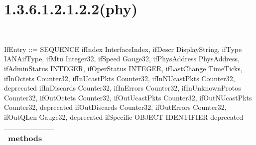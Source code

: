 \documentclass[letterpaper,10pt,english]{sphinxmanual}
\begin{document}
\section{1.3.6.1.2.1.2.2(phy)}
\label{\detokenize{oids:phy}}

\begin{fulllineitems}
\label{\detokenize{oids:confd_global_interface_container.confd_global_interface_container}}~
\def\sphinxLiteralBlockLabel{\label{\detokenize{oids:if-mib}}}
\begin{sphinxVerbatim}[commandchars=\\\{\}]
 IfEntry ::=
     SEQUENCE \PYGZob{}
         ifIndex                 InterfaceIndex,
         ifDescr                 DisplayString,
         ifType                  IANAifType,
         ifMtu                   Integer32,
         ifSpeed                 Gauge32,
         ifPhysAddress           PhysAddress,
         ifAdminStatus           INTEGER,
         ifOperStatus            INTEGER,
         ifLastChange            TimeTicks,
         ifInOctets              Counter32,
         ifInUcastPkts           Counter32,
         ifInNUcastPkts          Counter32,  \PYGZhy{}\PYGZhy{} deprecated
         ifInDiscards            Counter32,
         ifInErrors              Counter32,
         ifInUnknownProtos       Counter32,
         ifOutOctets             Counter32,
         ifOutUcastPkts          Counter32,
         ifOutNUcastPkts         Counter32,  \PYGZhy{}\PYGZhy{} deprecated
         ifOutDiscards           Counter32,
         ifOutErrors             Counter32,
         ifOutQLen               Gauge32,    \PYGZhy{}\PYGZhy{} deprecated
         ifSpecific              OBJECT IDENTIFIER \PYGZhy{}\PYGZhy{} deprecated
     \PYGZcb{}
\end{sphinxVerbatim}


\begin{savenotes}\sphinxattablestart
\centering
\begin{tabulary}{\linewidth}[t]{|T|T|}
\hline

methods
&\\
\hline
\end{tabulary}
\par
\sphinxattableend\end{savenotes}


\end{fulllineitems}
\end{document}
